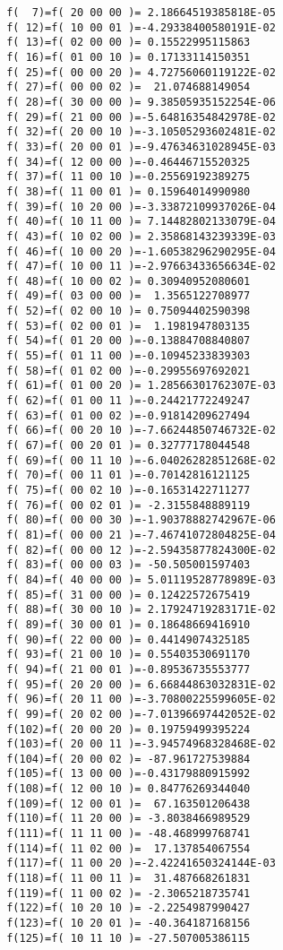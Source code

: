 \begin{footnotesize}
\begin{verbatim}
 f(  7)=f( 20 00 00 )= 2.18664519385818E-05
 f( 12)=f( 10 00 01 )=-4.29338400580191E-02
 f( 13)=f( 02 00 00 )= 0.15522995115863
 f( 16)=f( 01 00 10 )= 0.17133114150351
 f( 25)=f( 00 00 20 )= 4.72756060119122E-02
 f( 27)=f( 00 00 02 )=  21.074688149054
 f( 28)=f( 30 00 00 )= 9.38505935152254E-06
 f( 29)=f( 21 00 00 )=-5.64816354842978E-02
 f( 32)=f( 20 00 10 )=-3.10505293602481E-02
 f( 33)=f( 20 00 01 )=-9.47634631028945E-03
 f( 34)=f( 12 00 00 )=-0.46446715520325
 f( 37)=f( 11 00 10 )=-0.25569192389275
 f( 38)=f( 11 00 01 )= 0.15964014990980
 f( 39)=f( 10 20 00 )=-3.33872109937026E-04
 f( 40)=f( 10 11 00 )= 7.14482802133079E-04
 f( 43)=f( 10 02 00 )= 2.35868143239339E-03
 f( 46)=f( 10 00 20 )=-1.60538296290295E-04
 f( 47)=f( 10 00 11 )=-2.97663433656634E-02
 f( 48)=f( 10 00 02 )= 0.30940952080601
 f( 49)=f( 03 00 00 )=  1.3565122708977
 f( 52)=f( 02 00 10 )= 0.75094402590398
 f( 53)=f( 02 00 01 )=  1.1981947803135
 f( 54)=f( 01 20 00 )=-0.13884708840807
 f( 55)=f( 01 11 00 )=-0.10945233839303
 f( 58)=f( 01 02 00 )=-0.29955697692021
 f( 61)=f( 01 00 20 )= 1.28566301762307E-03
 f( 62)=f( 01 00 11 )=-0.24421772249247
 f( 63)=f( 01 00 02 )=-0.91814209627494
 f( 66)=f( 00 20 10 )=-7.66244850746732E-02
 f( 67)=f( 00 20 01 )= 0.32777178044548
 f( 69)=f( 00 11 10 )=-6.04026282851268E-02
 f( 70)=f( 00 11 01 )=-0.70142816121125
 f( 75)=f( 00 02 10 )=-0.16531422711277
 f( 76)=f( 00 02 01 )= -2.3155848889119
 f( 80)=f( 00 00 30 )=-1.90378882742967E-06
 f( 81)=f( 00 00 21 )=-7.46741072804825E-04
 f( 82)=f( 00 00 12 )=-2.59435877824300E-02
 f( 83)=f( 00 00 03 )= -50.505001597403
 f( 84)=f( 40 00 00 )= 5.01119528778989E-03
 f( 85)=f( 31 00 00 )= 0.12422572675419
 f( 88)=f( 30 00 10 )= 2.17924719283171E-02
 f( 89)=f( 30 00 01 )= 0.18648669416910
 f( 90)=f( 22 00 00 )= 0.44149074325185
 f( 93)=f( 21 00 10 )= 0.55403530691170
 f( 94)=f( 21 00 01 )=-0.89536735553777
 f( 95)=f( 20 20 00 )= 6.66844863032831E-02
 f( 96)=f( 20 11 00 )=-3.70800225599605E-02
 f( 99)=f( 20 02 00 )=-7.01396697442052E-02
 f(102)=f( 20 00 20 )= 0.19759499395224
 f(103)=f( 20 00 11 )=-3.94574968328468E-02
 f(104)=f( 20 00 02 )= -87.961727539884
 f(105)=f( 13 00 00 )=-0.43179880915992
 f(108)=f( 12 00 10 )= 0.84776269344040
 f(109)=f( 12 00 01 )=  67.163501206438
 f(110)=f( 11 20 00 )= -3.8038466989529
 f(111)=f( 11 11 00 )= -48.468999768741
 f(114)=f( 11 02 00 )=  17.137854067554
 f(117)=f( 11 00 20 )=-2.42241650324144E-03
 f(118)=f( 11 00 11 )=  31.487668261831
 f(119)=f( 11 00 02 )= -2.3065218735741
 f(122)=f( 10 20 10 )= -2.2254987990427
 f(123)=f( 10 20 01 )= -40.364187168156
 f(125)=f( 10 11 10 )= -27.507005386115

\end{verbatim}
\end{footnotesize}

